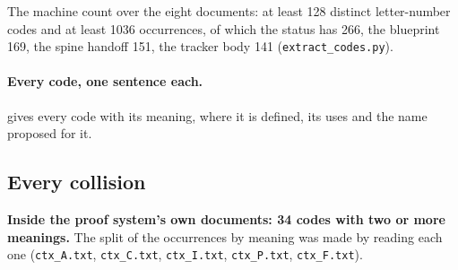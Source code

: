 \begin{sloppypar}
The machine count over the eight documents: at least 128 distinct letter-number codes and at least 1036 occurrences, of which the status has 266, the blueprint 169, the spine handoff 151, the tracker body 141 (\texttt{extract\_\allowbreak{}codes.\allowbreak{}py}).
\end{sloppypar}

\paragraph{Every code, one sentence each.}  gives every code with its meaning, where it is defined, its uses and the name proposed for it.

\subsection{Every collision}\label{sec:docs-code-collisions}

\begin{sloppypar}
\textbf{Inside the proof system's own documents: 34 codes with two or more meanings.} The split of the occurrences by meaning was made by reading each one (\texttt{ctx\_\allowbreak{}A.\allowbreak{}txt}, \texttt{ctx\_\allowbreak{}C.\allowbreak{}txt}, \texttt{ctx\_\allowbreak{}I.\allowbreak{}txt}, \texttt{ctx\_\allowbreak{}P.\allowbreak{}txt}, \texttt{ctx\_\allowbreak{}F.\allowbreak{}txt}).
\end{sloppypar}

